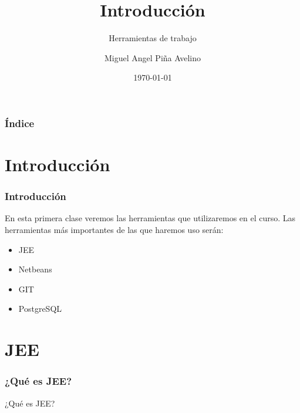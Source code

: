 \documentclass{beamer}
\title[Laboratorio]{Introducción}
\subtitle{Herramientas de trabajo}
\author[Miguel]{Miguel Angel Piña Avelino}
\institute[UNAM]{
  Facultad de Ciencias, UNAM
}
\date{\today}
\begin{document}
\frame{\titlepage}

\begin{frame}
  \frametitle{Índice}
  \tableofcontents
\end{frame}

\section{Introducción}
\begin{frame}
  \frametitle{Introducción}
  En esta primera clase veremos las herramientas que utilizaremos en el curso. Las herramientas más importantes de las que haremos uso serán:
  \begin{itemize}
    \item JEE
    \item Netbeans
    \item GIT
    \item PostgreSQL
  \end{itemize}
\end{frame}
\section{JEE}
\begin{frame}[]
  \frametitle{¿Qué es JEE?}
  ¿Qué es JEE?
\end{frame}
\end{document}
